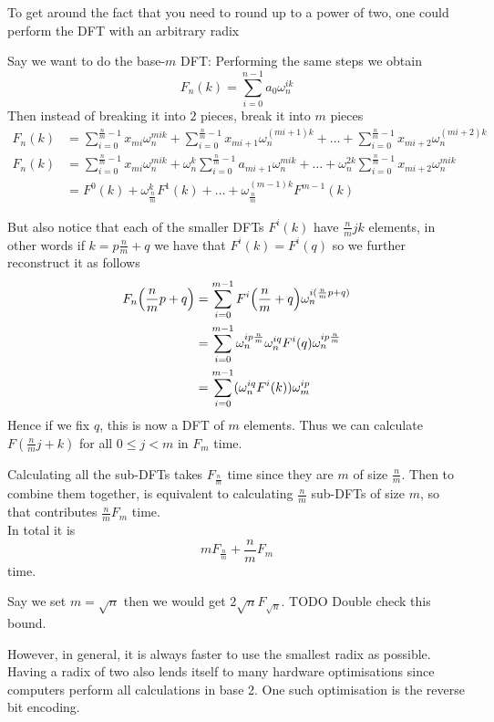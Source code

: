 To get around the fact that you need to round up to a power of two, one could perform the DFT with an arbitrary radix

Say we want to do the base-$m$ DFT:
Performing the same steps we obtain
\[
    F_n(k) = \sum^{n-1}_{i=0} a_0\omega_n^{ik}
\]
Then instead of breaking it into $2$ pieces, break it into $m$ pieces
\begin{align*}
    F_n(k) &= \sum^{\frac{n}{m}-1}_{i=0} x_{mi}\omega_n^{mik} + \sum^{\frac{n}{m}-1}_{i=0} x_{mi+1}\omega_n^{(mi+1)k} + \ldots + \sum^{\frac{n}{m}-1}_{i=0} x_{mi+2}\omega_n^{(mi+2)k}\\
    F_n(k) &= \sum^{\frac{n}{m}-1}_{i=0} x_{mi}\omega_n^{mik} + \omega_n^k\sum^{\frac{n}{m}-1}_{i=0} a_{mi+1}\omega_n^{mik} + \ldots +  \omega_n^{2k}\sum^{\frac{n}{m}-1}_{i=0} x_{mi+2}\omega_n^{mik}\\
    &= F^0(k) + \omega_{\frac{n}{m}}^k F^1(k) + \ldots + \omega_{\frac{n}{m}}^{(m-1)k} F^{m-1}(k)
\end{align*}

But also notice that each of the smaller DFTs $F^i(k)$ have $\frac{n}{m}jk$ elements, in other words if $k = p\frac{n}{m} + q$ we have that $F^i(k) = F^i(q)$ so we further reconstruct it as follows
\begin{align*}
    F_n\bb{\frac{n}{m}p + q} &= \sum^{m-1}_{i=0} F^i\bb{\frac{n}{m} + q}\omega^{i(\frac{n}{m}p + q)}_n\\
    &= \sum^{m-1}_{i=0} \omega^{ip\frac{n}{m}}_n \omega_n^{iq} F^i(q)\omega^{ip\frac{n}{m}}_n\\
    &= \sum^{m-1}_{i=0} (\omega^{iq}_n F^i(k))\omega^{ip}_m\\
\end{align*}
Hence if we fix $q$, this is now a DFT of $m$ elements. Thus we can calculate $F(\frac{n}{m}j + k)$ for all $0 \leq j < m$ in $F_m$ time.

Calculating all the sub-DFTs takes $F_{\frac{n}{m}}$ time since they are $m$ of size $\frac{n}{m}$. Then to combine them together, is equivalent to calculating $\frac{n}{m}$ sub-DFTs of size $m$, so that contributes $\frac{n}{m}F_{m}$ time.\\
In total it is
\[
    mF_{\frac{n}{m}} + \frac{n}{m}F_m
\]
time.

Say we set $m = \sqrt{n}$ then we would get $2\sqrt{n}F_{\sqrt{n}}$. TODO Double check this bound.

However, in general, it is always faster to use the smallest radix as possible. Having a radix of two also lends itself to many hardware optimisations since computers perform all calculations in base 2. One such optimisation is the reverse bit encoding.

